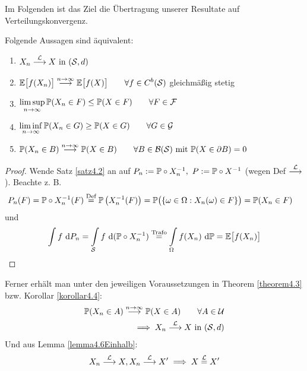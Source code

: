 Im Folgenden ist das Ziel die Übertragung unserer Resultate auf Verteilungskonvergenz.

\begin{satz}\label{satz4.7}\enter
	Folgende Aussagen sind äquivalent:
	\begin{enumerate}[label=(\arabic*)]
		\item $\begin{aligned}
			X_n\stackrel{\L}{\longrightarrow} X\text{ in }(\S,d)
		\end{aligned}$
		\item $\begin{aligned}
			\E\big[f(X_n)\big]\stackrel{n\to\infty}{\longrightarrow}\E\big[f(X)\big]\qquad\forall f\in C^b(\S)
		\end{aligned}$ gleichmäßig stetig
		\item $\begin{aligned}
			\limsup\limits_{n\to\infty}\P(X_n\in F)\leq\P(X\in F)\qquad\forall F\in\F
		\end{aligned}$
		\item $\begin{aligned}
			\liminf\limits_{n\to\infty}\P(X_n\in G)\geq\P(X\in G)\qquad\forall G\in\G
		\end{aligned}$
		\item $\begin{aligned}
			\P(X_n\in B)\stackrel{n\to\infty}{\longrightarrow}\P(X\in B)\qquad\forall B\in\B(\S)\mit\P(X\in\partial B)=0
		\end{aligned}$
	\end{enumerate}
\end{satz}

\begin{proof}
	Wende Satz \ref{satz4.2} an auf $P_n:=\P\circ X^{-1}_n,~P:=\P\circ X^{-1}$ (wegen Def $\stackrel{\L}{\longrightarrow}$). 
	Beachte z. B.
	\begin{align*}
		P_n(F)&=\P\circ X^{-1}_n(F)
		\stackeq{\text{Def}}
		\P\left(X_n^{-1}(F)\right)
		=\P\big(\lbrace\omega\in\Omega:X_n(\omega)\in F\rbrace\big)
		=\P(X_n\in F)
	\end{align*}
	und 
	\begin{align*}
		\int\limits f\d P_n
		=
		\int\limits_{\S} f\d(\P\circ X_n^{-1})
		\stackeq{\text{Trafo}}
		\int\limits_\Omega f(X_n)\d\P
		=\E\big[f(X_n)\big]
	\end{align*}
\end{proof}

Ferner erhält man unter den jeweiligen Voraussetzungen in Theorem \ref{theorem4.3} bzw. Korollar \ref{korollar4.4}:
\begin{align*}
	\P(X_n\in A)\stackrel{n\to\infty}{\longrightarrow}\P(X\in A)\qquad\forall A\in\U\\
	\implies X_n\stackrel{\L}{\longrightarrow} X\text{ in }(\S,d)
\end{align*}
Und aus Lemma \ref{lemma4.6Einhalb}:
\begin{align*}
	X_n\stackrel{\L}{\longrightarrow} X,X_n\stackrel{\L}{\longrightarrow} X'\implies X\stackeq{\L}X'
\end{align*}

